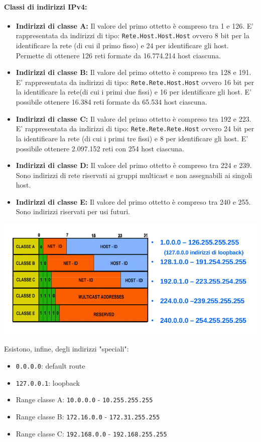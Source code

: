 \documentclass[a4paper]{report}
\begin{document}
\paragraph{Classi di indirizzi IPv4:}
\begin{itemize}
\item \textbf{Indirizzi di classe A:} Il valore del primo ottetto è compreso tra 1 e 126. E' rappresentata da
indirizzi di tipo: \texttt{Rete.Host.Host.Host} ovvero 8 bit per la identificare la rete (di cui il primo fisso) e
24 per identificare gli host. Permette di ottenere 126 reti formate da 16.774.214 host ciascuna.
\item \textbf{Indirizzi di classe B:} Il valore del primo ottetto è compreso tra 128 e 191. E' rappresentata da
indirizzi di tipo: \texttt{Rete.Rete.Host.Host} ovvero 16 bit per la identificare la rete(di cui i primi due
fissi) e 16 per identificare gli host. E' possibile ottenere 16.384 reti formate da 65.534 host
ciascuna.
\item \textbf{Indirizzi di classe C:} Il valore del primo ottetto è compreso tra 192 e 223. E' rappresentata da
indirizzi di tipo: \texttt{Rete.Rete.Rete.Host} ovvero 24 bit per la identificare la rete (di cui i primi tre
fissi) e 8 per identificare gli host. E' possibile ottenere 2.097.152 reti con 254 host ciascuna.
\item \textbf{Indirizzi di classe D:} Il valore del primo ottetto è compreso tra 224 e 239. Sono indirizzi di rete
riservati ai gruppi multicast e non assegnabili ai singoli host.
\item \textbf{Indirizzi di classe E:} Il valore del primo ottetto è compreso tra 240 e 255. Sono indirizzi
riservati per usi futuri.
\end{itemize}
\begin{center}
\includegraphics[scale=0.5]{ipv4classi.png}
\end{center}
Esistono, infine, degli indirizzi "speciali":
\begin{itemize}
\item \texttt{0.0.0.0}: default route
\item \texttt{127.0.0.1}: loopback
\item Range classe A: \texttt{10.0.0.0} - \texttt{10.255.255.255}
\item Range classe B: \texttt{172.16.0.0} - \texttt{172.31.255.255}
\item Range classe C: \texttt{192.168.0.0} - \texttt{192.168.255.255}
\end{itemize}
\end{document}
